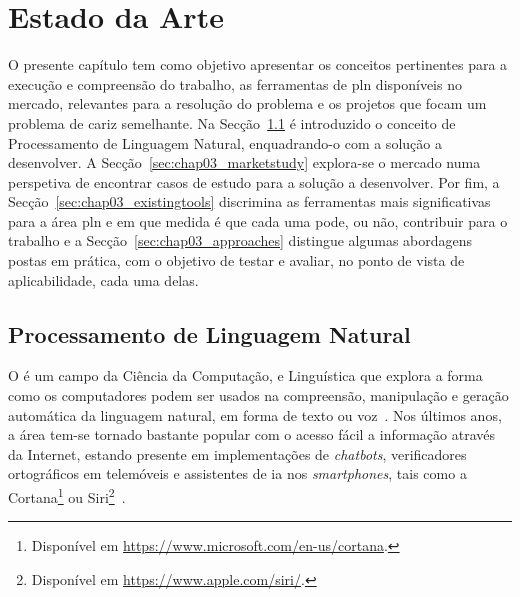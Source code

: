 \chapter{Estado da Arte}
\label{chap:Chapter3}
O presente capítulo tem como objetivo apresentar os conceitos pertinentes para a execução e compreensão do trabalho, as ferramentas de \gls{pln} disponíveis no mercado, relevantes para a resolução do problema e os projetos que focam um problema de cariz semelhante. Na Secção~\ref{sec:chap03_pln} é introduzido o conceito de Processamento de Linguagem Natural, enquadrando-o com a solução a desenvolver. A Secção~\ref{sec:chap03_marketstudy} explora-se o mercado numa perspetiva de encontrar casos de estudo para a solução a desenvolver. Por fim, a Secção~\ref{sec:chap03_existingtools} discrimina as ferramentas mais significativas para a área \gls{pln} e em que medida é que cada uma pode, ou não, contribuir para o trabalho e a Secção~\ref{sec:chap03_approaches} distingue algumas abordagens postas em prática, com o objetivo de testar e avaliar, no ponto de vista de aplicabilidade, cada uma delas.

\section{Processamento de Linguagem Natural}
\label{sec:chap03_pln}
O  é um campo da Ciência da Computação,  e Linguística que explora a forma como os computadores podem ser usados na compreensão, manipulação e geração automática da linguagem natural, em forma de texto ou voz~\parencite{nlp, applied_natural_language_processing_with_python, pln_extracao_conhecimento}. Nos últimos anos, a área tem-se tornado bastante popular com o acesso fácil a informação através da Internet, estando presente em implementações de \textit{chatbots}, verificadores ortográficos em telemóveis e assistentes de \gls{ia} nos \textit{smartphones}, tais como a Cortana\footnote{Disponível em \url{https://www.microsoft.com/en-us/cortana}.} ou Siri\footnote{Disponível em \url{https://www.apple.com/siri/}.}~\parencite{pln_extracao_conhecimento, applied_natural_language_processing_with_python}. 

